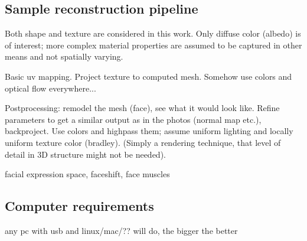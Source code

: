 
\subsection{Sample reconstruction pipeline} %

Both shape and texture are considered in this work. Only diffuse color (albedo) is of interest; more complex material properties are assumed to be captured in other means and not spatially varying.

Basic uv mapping. Project texture to computed mesh. Somehow use colors and optical flow everywhere...

Postprocessing: remodel the mesh (face), see what it would look like. Refine parameters to get a similar output as in the photos (normal map etc.), backproject. Use colors and highpass them; assume uniform lighting and locally uniform texture color (bradley). (Simply a rendering technique, that level of detail in 3D structure might not be needed).

facial expression space, faceshift, face muscles
%
%
%
%


\subsection{Computer requirements} %

any pc with usb and linux/mac/?? will do, the bigger the better


